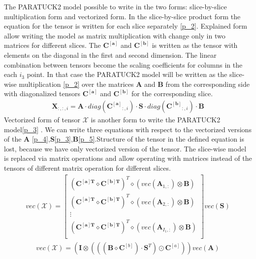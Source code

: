 The PARATUCK2 model possible to write in the two forms: slice-by-slice multiplication form and vectorized form.
In the  slice-by-slice product form the equation for the tensor is written for each slice separately \eqref{p_2}. Explained form allow writing the model as matrix multiplication with change only in two matrices for different slices.  The $\mathbf{C^{[a]}}$ and $\mathbf{C^{[b]}}$ is written as the tensor with elements on the diagonal in the first and second dimension. The linear combination between tensors become the scaling coefficients for columns in the each $i_3$ point. In that case the PARATUCK2 model will be written as the slice-wise multiplication \eqref{p_2} over the matrices $\mathbf{A} $ and $\mathbf{B} $ from the corresponding side with diagonalized tensors $\mathbf{C^{[a]}}$ and $\mathbf{C^{[b]}}$ for the corresponding slice\cite{Book12}.
\begin{align}
\mathbf{X}_{:,:,i}=\mathbf{A}\cdot diag(\mathbf{C^{[a]}}_{:,i})\cdot \mathbf{S}\cdot diag(\mathbf{C^{[b]}}_{:,i})\cdot \mathbf{B}
\label{p_2}
\end{align}
Vectorized form of tensor $\mathcal{X}$ is another form to write the PARATUCK2 model\eqref{p_3} . We can write three equations with respect to the vectorized versions of the $\mathbf{A}$ \eqref{p_4},$\mathbf{S}$\eqref{p_3},$\mathbf{B}$\eqref{p_5}\cite{Book26}.Structure of the tensor in the defined equation is lost,  because we have only vectorized version of the tensor. The slice-wise model is replaced via matrix operations and allow operating with matrices instead of the tensors of different matrix operation for different slices\cite{Book26}.
\begin{align}
vec(\mathcal{X})=\begin{bmatrix}
(\mathbf{C^{[a]T}} \diamond \mathbf{C^{[b]T}})^T \diamond (vec(\mathbf{A}_{1,:})\otimes \mathbf{B})\\
(\mathbf{C^{[a]T}} \diamond \mathbf{C^{[b]T}})^T \diamond (vec(\mathbf{A}_{2,:})\otimes \mathbf{B})\\
\vdots \\
(\mathbf{C^{[a]T}} \diamond \mathbf{C^{[b]T}})^T \diamond (vec(\mathbf{A}_{I_1,:})\otimes \mathbf{B})\\
\end{bmatrix} vec(\mathbf{S})
\label{p_3}
\end{align}
\begin{align}
vec(\mathcal{X})=(\mathbf{I} \otimes(((\mathbf{B}\diamond \mathbf{C}^{[b]}) \cdot \mathbf{S}^T) \odot \mathbf{C}^{[a]}) )vec(\mathbf{A})
\label{p_4}
\end{align}
